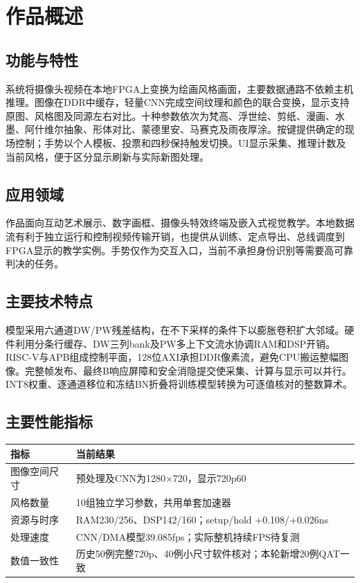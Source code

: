 \section{作品概述}
\subsection{功能与特性}
系统将摄像头视频在本地FPGA上变换为绘画风格画面，主要数据通路不依赖主机推理。图像在DDR中缓存，轻量CNN完成空间纹理和颜色的联合变换，显示支持原图、风格图及同源左右对比。十种参数依次为梵高、浮世绘、剪纸、漫画、水墨、阿什维尔抽象、形体对比、蒙德里安、马赛克及雨夜厚涂。按键提供确定的现场控制；手势以个人模板、投票和四秒保持触发切换。UI显示采集、推理计数及当前风格，便于区分显示刷新与实际新图处理。

\subsection{应用领域}
作品面向互动艺术展示、数字画框、摄像头特效终端及嵌入式视觉教学。本地数据流有利于独立运行和控制视频传输开销，也提供从训练、定点导出、总线调度到FPGA显示的教学实例。手势仅作为交互入口，当前不承担身份识别等需要高可靠判决的任务。

\subsection{主要技术特点}
模型采用六通道DW/PW残差结构，在不下采样的条件下以膨胀卷积扩大邻域。硬件利用分条行缓存、DW三列bank及PW多上下文流水协调RAM和DSP开销。RISC-V与APB组成控制平面，128位AXI承担DDR像素流，避免CPU搬运整幅图像。完整帧发布、最终B响应屏障和安全消隐提交使采集、计算与显示可以并行。INT8权重、逐通道移位和冻结BN折叠将训练模型转换为可逐值核对的整数算术。

\subsection{主要性能指标}
\begin{table}[H]\centering\small
\begin{tabularx}{\linewidth}{@{}lX@{}}\toprule 指标 & 当前结果\\\midrule
图像空间尺寸 & 预处理及CNN为1280×720，显示720p60\\
风格数量 & 10组独立学习参数，共用单套加速器\\
资源与时序 & RAM230/256、DSP142/160；setup/hold +0.108/+0.026ns\\
处理速度 & CNN/DMA模型39.085fps；实际整机持续FPS待复测\\
数值一致性 & 历史50例完整720p、40例小尺寸软件核对；本轮新增20例QAT一致\\\bottomrule
\end{tabularx}
\end{table}

